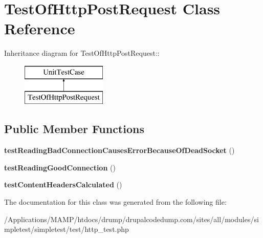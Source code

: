 \hypertarget{class_test_of_http_post_request}{
\section{TestOfHttpPostRequest Class Reference}
\label{class_test_of_http_post_request}
}
Inheritance diagram for TestOfHttpPostRequest::\begin{figure}[H]
\begin{center}
\leavevmode
\includegraphics[height=2cm]{class_test_of_http_post_request}
\end{center}
\end{figure}
\subsection*{Public Member Functions}
\begin{DoxyCompactItemize}
\item 
\hypertarget{class_test_of_http_post_request_aefdbbaffcff142fa09cf4dc26962242f}{
{\bfseries testReadingBadConnectionCausesErrorBecauseOfDeadSocket} ()}
\label{class_test_of_http_post_request_aefdbbaffcff142fa09cf4dc26962242f}

\item 
\hypertarget{class_test_of_http_post_request_ab35006c401bffb360eceb78171ced8a2}{
{\bfseries testReadingGoodConnection} ()}
\label{class_test_of_http_post_request_ab35006c401bffb360eceb78171ced8a2}

\item 
\hypertarget{class_test_of_http_post_request_aeb37c7793c94aec431556f6c3dcdad2d}{
{\bfseries testContentHeadersCalculated} ()}
\label{class_test_of_http_post_request_aeb37c7793c94aec431556f6c3dcdad2d}

\end{DoxyCompactItemize}


The documentation for this class was generated from the following file:\begin{DoxyCompactItemize}
\item 
/Applications/MAMP/htdocs/drump/drupalcodedump.com/sites/all/modules/simpletest/simpletest/test/http\_\-test.php\end{DoxyCompactItemize}
